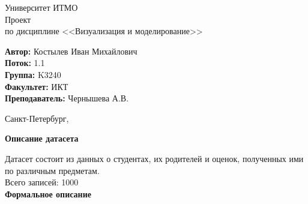 \documentclass[12pt,a4paper]{article}
\begin{document}
	
\begin{titlepage}
	
\begin{center}
	\large Университет ИТМО\\[5cm]
	\LARGE Проект\\
	\normalsize по дисциплине <<Визуализация и моделирование>>\\[5cm]
\end{center}
\begin{flushright}
		\begin{minipage}{0.6\textwidth}
		\begin{flushleft}
			\large
			\singlespacing 
			\textbf{Автор:} Костылев Иван Михайлович\\
			\textbf{Поток:} 1.1\\
			\textbf{Группа:} K3240\\
			\textbf{Факультет:} ИКТ\\
			\textbf{Преподаватель:} Чернышева А.В.
		\end{flushleft}
	\end{minipage}
\end{flushright}

\vfill

\begin{center}
	{\large Санкт-Петербург, \the{}}
\end{center}
 
\end{titlepage}
\normalsize


\large \textbf{Описание датасета}

\normalsize
	Датасет состоит из данных о студентах, их родителей и оценок, полученных ими по различным предметам. \\

Всего записей: 1000 \\


\large \textbf{Формальное описание}
\end{document}

